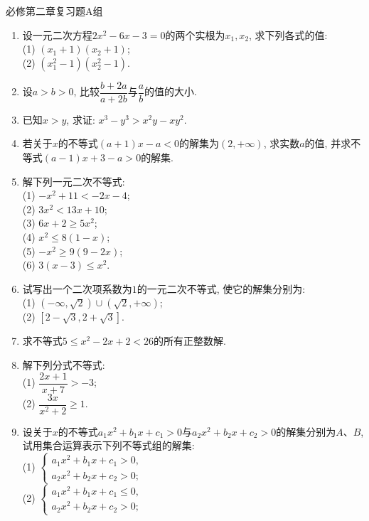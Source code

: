 \documentclass[10pt,a4paper]{article}
\begin{document}
必修第二章复习题A组
\begin{enumerate}[1.]

\item 设一元二次方程$2x^2-6x-3=0$的两个实根为$x_1,x_2$, 求下列各式的值:\\
(1) $(x_1+1)(x_2+1)$;\\
(2) $(x_1^2-1)(x_2^2-1)$.
\vspace*{3cm}
\item 设$a>b>0$, 比较$\dfrac{b+2a}{a+2b}$与$\dfrac ab$的值的大小.
\vspace*{3cm}
\item 已知$x>y$, 求证: $x^3-y^3>x^2y-xy^2$.
\vspace*{3cm}
\item 若关于$x$的不等式$(a+1)x-a<0$的解集为$(2,+\infty)$, 求实数$a$的值, 并求不等式$(a-1)x+3-a>0$的解集.
\vspace*{3cm}
\item 解下列一元二次不等式:\\
(1) $-x^2+11<-2x-4$;\\
(2) $3x^2<13x+10$;\\
(3) $6x+2\ge 5x^2$;\\
(4) $x^2\le 8(1-x)$;\\
(5) $-x^2\ge 9(9-2x)$;\\
(6) $3(x-3)\le x^2$.
\vspace*{3cm}
\item 试写出一个二次项系数为$1$的一元二次不等式, 使它的解集分别为:\\
(1) $(-\infty, \sqrt 2)\cup  (\sqrt 2, +\infty)$;\\
(2) $[2-\sqrt 3, 2+\sqrt 3]$.
\vspace*{3cm}
\item 求不等式$5\le x^2-2x+2<26$的所有正整数解.
\vspace*{3cm}
\item 解下列分式不等式:\\
(1) $\dfrac{2x+1}{x+7}>-3$;\\
(2) $\dfrac{3x}{x^2+2}\ge 1$.
\vspace*{3cm}
\item 设关于$x$的不等式$a_1x^2+b_1x+c_1>0$与$a_2x^2+b_2x+c_2>0$的解集分别为$A$、$B$,
试用集合运算表示下列不等式组的解集:\\
(1) $\begin{cases} a_1x^2+b_1x+c_1>0, \\ a_2x^2+b_2x+c_2>0;\end{cases}$\\
(2) $\begin{cases} a_1x^2+b_1x+c_1\le 0, \\ a_2x^2+b_2x+c_2>0;\end{cases}$\\

\end{enumerate}
\end{document}
